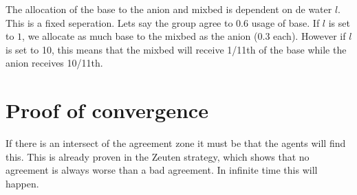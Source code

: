 The allocation of the base to the anion and mixbed is dependent on de water $l$. This is a fixed seperation. Lets say the group agree to 0.6 usage of base. If $l$ is set to $1$, we allocate as much base to the mixbed as the anion (0.3 each). However if $l$ is set to 10, this means that the mixbed will receive 1/11th of the base while the anion receives 10/11th. 


 
\section{Proof of convergence}
If there is an intersect of the agreement zone it must be that the agents will find this.
This is already proven in the Zeuten strategy, which shows that no agreement is always worse than a bad agreement. In infinite time this will happen. 


%
%



%



